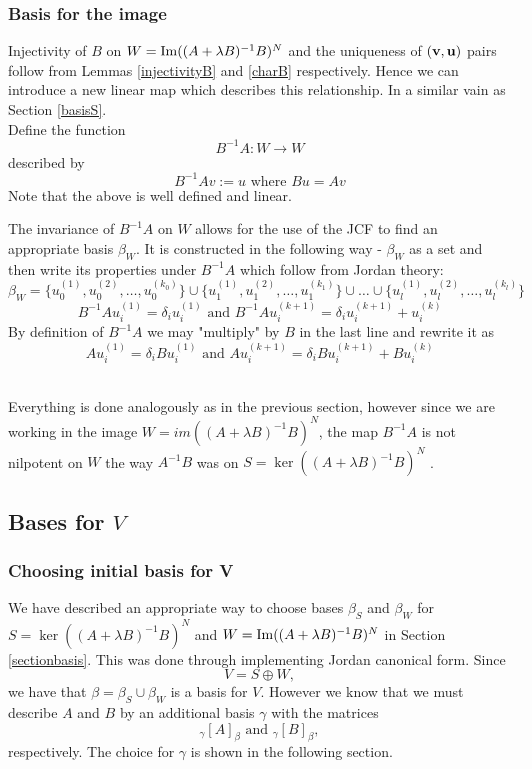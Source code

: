     \subsubsection{Basis for the image}\label{basisW}


    Injectivity of $B$ on $W=\operatorname{Im}((A+\lambda B)^{-1}B)^{N}$   and the uniqueness of $(\mathbf{v}, \mathbf{u})$ pairs follow from Lemmas \ref{injectivityB} and \ref{charB} respectively.
    Hence we can introduce a new linear map which describes this relationship.
    In a similar vain as Section \ref{basisS}. \\
    Define the function
    $$B^{-1}A :W\rightarrow W$$described by $$B^{-1}Av:=u \text{ where }Bu=Av$$
    Note that the above is well defined and linear.

    The invariance of $B^{-1}A$ on $W$  allows for the use of the JCF to find an appropriate basis $\beta_W$. It is constructed in the following way - $\beta_W$ as a set and then write its properties under $B^{-1}A$ which follow from Jordan theory:
    \begin{equation}\label{definitionbw}
\beta_W=\{u_{0}^{(1)},u_{0}^{(2)},\dots,u_{0}^{(k_0)}\} \cup \{u_{1}^{(1)},u_{1}^{(2)},\dots,u_{1}^{(k_1)}\} \cup \dots \cup \{u_{l}^{(1)},u_{l}^{(2)},\dots,u_{l}^{(k_l)}\}
 \end{equation} $$B^{-1}Au_{i}^{(1)}=\delta_i u_{i}^{(1)}\text{ and }B^{-1}Au_{i}^{(k+1)}=\delta_i u_{i}^{(k+1)}+u_{i}^{(k)}$$ By definition of $B^{-1}A$ we may "multiply" by $B$ in the last line and rewrite it as
    \begin{equation}
        Au_{i}^{(1)}=\delta_i Bu_{i}^{(1)}\text{ and }Au_{i}^{(k+1)}=\delta_i Bu_{i}^{(k+1)}+Bu_{i}^{(k)}
    \end{equation}
    \\

    \begin{remark}
        Everything is done analogously as in the previous section, however since we are working in the image $W=im((A+\lambda B)^{-1}B)^N$, the map $B^{-1}A$ is not nilpotent on $W$ the way $A^{-1}B$ was on $S=\ker((A+\lambda  B)^{-1}B)^N$ .
    \end{remark}

\subsection{Bases for $V$}
\subsubsection{Choosing initial basis for V}
We have described an appropriate way to choose bases $\beta_S$ and $\beta_W$ for $S=\ker((A+\lambda B)^{-1}B)^N$ and $W= \operatorname{Im}((A+\lambda B)^{-1}B)^{N}$ in Section \ref{sectionbasis}. This was done through implementing Jordan canonical form.  Since  $$V=S\oplus W,$$ we have that $\beta=\beta_S\cup\beta_W$ is a basis for $V$. However we know that we must describe $A$ and $B$ by an additional basis $\gamma$ with the matrices
$$_\gamma[A]_\beta\text{ and } _\gamma[B]_\beta,  $$respectively. The choice for $\gamma$ is shown in the following section.



